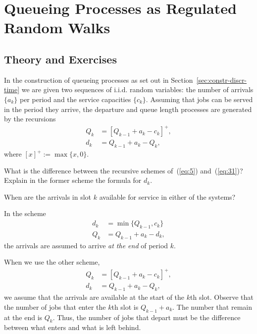 \section{Queueing Processes as Regulated Random Walks}
\label{sec:queu-proc-as}

\subsection*{Theory and Exercises}
\label{sec:exercises}




In the construction of queueing processes as set out in
Section~\ref{sec:constr-discr-time} we are given two sequences of
i.i.d. random variables: the number of arrivals $\{a_k\}$ per period
and the service capacities $\{c_k\}$. Assuming that jobs can be served
in the period they arrive, the departure and queue length processes
are generated by the recursions
\begin{equation}\label{eq:5}
  \begin{split}
  Q_k &= [Q_{k-1}+a_k - c_k]^+,\\
  d_k &= Q_{k-1} +a_k- Q_{k},
  \end{split}
\end{equation}
where $[x]^+ := \max\{x, 0\}$.  

\begin{exercise}
  What is the difference between the recursive schemes of~(\ref{eq:5}) and~(\ref{eq:31})? Explain in the former scheme
  the formula for $d_k$.  
  \begin{hint}
When are the arrivals in slot $k$
    available for service in either of the systems?
  \end{hint}
\begin{solution}
  In the scheme
  \begin{equation*}
    \begin{split}
      d_k &= \min\{Q_{k-1}, c_k\}\\
Q_k &= Q_{k-1} + a_k - d_k,
    \end{split}
  \end{equation*}
the arrivals are assumed to arrive \emph{at the end} of period $k$. 

When we use the other scheme,
  \begin{equation*}
    \begin{split}
      Q_k &= [Q_{k-1} + a_k - c_k]^+,\\
      d_k &= Q_{k-1} + a_k - Q_k,
    \end{split}
  \end{equation*}
  we assume that the arrivals are available at the start of the $k$th
  slot. Observe that the number of jobs that enter the $k$th slot is
  $Q_{k-1}+a_k$. The number that remain at the end is $Q_k$. Thus, the
  number of jobs that depart must be the difference between what
  enters and what is left behind.
\end{solution}
\end{exercise}


